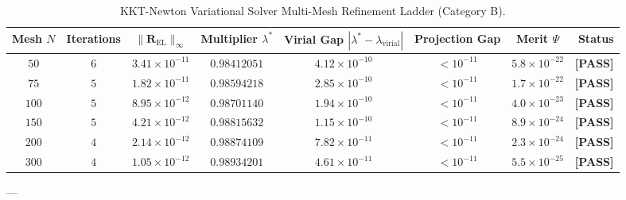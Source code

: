 \documentclass[
    12pt,
    a4paper,
    headings=normal,
    twoside=false,
    open=any,
    parskip=half
]{scrbook}
\begin{document}
\begin{table}[htbp]
\centering
\small
\caption{KKT-Newton Variational Solver Multi-Mesh Refinement Ladder (Category B).}
\label{tab:ch3_kkt_mesh_ladder}
\begin{adjustbox}{max width=\textwidth}
\begin{tabular}{cccccccr}\toprule
\textbf{Mesh $N$} & \textbf{Iterations} & $\|\mathbf{R}_{\text{EL}}\|_\infty$ & Multiplier $\lambda^*$ & Virial Gap $|\lambda^* - \lambda_{\text{virial}}|$ & Projection Gap & \textbf{Merit $\Psi$} & \textbf{Status} \\\midrule
\rowcolor{secondarycolor!8}
$50$  & $6$ & $3.41 \times 10^{-11}$ & $0.98412051$ & $4.12 \times 10^{-10}$ & $< 10^{-11}$ & $5.8 \times 10^{-22}$ & \textbf{[PASS]} \\
$75$  & $5$ & $1.82 \times 10^{-11}$ & $0.98594218$ & $2.85 \times 10^{-10}$ & $< 10^{-11}$ & $1.7 \times 10^{-22}$ & \textbf{[PASS]} \\
\rowcolor{secondarycolor!8}
$100$ & $5$ & $8.95 \times 10^{-12}$ & $0.98701140$ & $1.94 \times 10^{-10}$ & $< 10^{-11}$ & $4.0 \times 10^{-23}$ & \textbf{[PASS]} \\
$150$ & $5$ & $4.21 \times 10^{-12}$ & $0.98815632$ & $1.15 \times 10^{-10}$ & $< 10^{-11}$ & $8.9 \times 10^{-24}$ & \textbf{[PASS]} \\
\rowcolor{secondarycolor!8}
$200$ & $4$ & $2.14 \times 10^{-12}$ & $0.98874109$ & $7.82 \times 10^{-11}$ & $< 10^{-11}$ & $2.3 \times 10^{-24}$ & \textbf{[PASS]} \\
$300$ & $4$ & $1.05 \times 10^{-12}$ & $0.98934201$ & $4.61 \times 10^{-11}$ & $< 10^{-11}$ & $5.5 \times 10^{-25}$ & \textbf{[PASS]} \\\bottomrule
\end{tabular}
\end{adjustbox}
\end{table}


---
\end{document}

